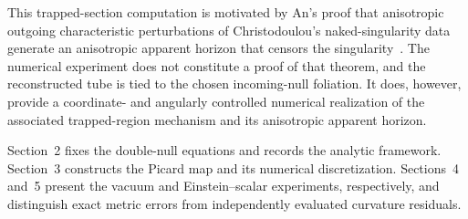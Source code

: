 This trapped-section computation is motivated by An's proof that anisotropic
outgoing characteristic perturbations of Christodoulou's naked-singularity
data generate an anisotropic apparent horizon that censors the
singularity~\cite{an-25}.  The numerical experiment does not constitute a
proof of that theorem, and the reconstructed tube is tied to the chosen
incoming-null foliation.  It does, however, provide a coordinate- and
angularly controlled numerical realization of the associated trapped-region
mechanism and its anisotropic apparent horizon.

Section~2 fixes the double-null equations and records the analytic framework.
Section~3 constructs the Picard map and its numerical discretization.
Sections~4 and~5 present the vacuum and Einstein--scalar experiments,
respectively, and distinguish exact metric errors from independently
evaluated curvature residuals.

